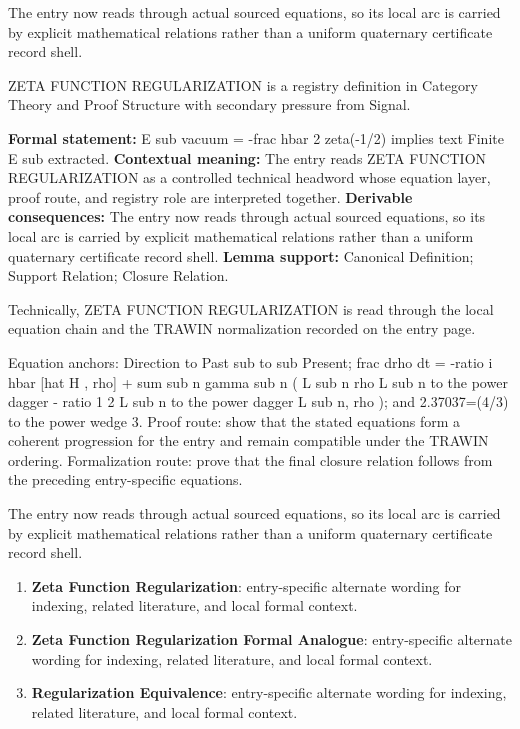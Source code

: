 The entry now reads through actual sourced equations, so its local arc is carried by explicit mathematical relations rather than a uniform quaternary certificate record shell.
\clearpage


\begingroup\small
{}
ZETA FUNCTION REGULARIZATION is a registry definition in Category Theory and Proof Structure with secondary pressure from Signal.

\begingroup\footnotesize\setlength{\emergencystretch}{3em}\sloppy
\textbf{Formal statement:} E sub vacuum = -frac hbar 2 zeta(-1/2) implies text Finite E sub extracted. \textbf{Contextual meaning:} The entry reads ZETA FUNCTION REGULARIZATION as a controlled technical headword whose equation layer, proof route, and registry role are interpreted together. \textbf{Derivable consequences:} The entry now reads through actual sourced equations, so its local arc is carried by explicit mathematical relations rather than a uniform quaternary certificate record shell. \textbf{Lemma support:} Canonical Definition; Support Relation; Closure Relation.\par
\endgroup

Technically, ZETA FUNCTION REGULARIZATION is read through the local equation chain and the TRAWIN normalization recorded on the entry page.

Equation anchors: Direction to Past sub to sub Present; frac drho dt = -ratio i hbar [hat H , rho] + sum sub n gamma sub n ( L sub n rho L sub n to the power dagger - ratio 1 2 L sub n to the power dagger L sub n, rho ); and 2.37037=(4/3) to the power wedge 3. Proof route: show that the stated equations form a coherent progression for the entry and remain compatible under the TRAWIN ordering. Formalization route: prove that the final closure relation follows from the preceding entry-specific equations.

The entry now reads through actual sourced equations, so its local arc is carried by explicit mathematical relations rather than a uniform quaternary certificate record shell.
\endgroup

\begin{enumerate}[leftmargin=1.6em,itemsep=6pt,topsep=4pt]
\item \textbf{Zeta Function Regularization}: entry-specific alternate wording for indexing, related literature, and local formal context.
\item \textbf{Zeta Function Regularization Formal Analogue}: entry-specific alternate wording for indexing, related literature, and local formal context.
\item \textbf{Regularization Equivalence}: entry-specific alternate wording for indexing, related literature, and local formal context.
\end{enumerate}


